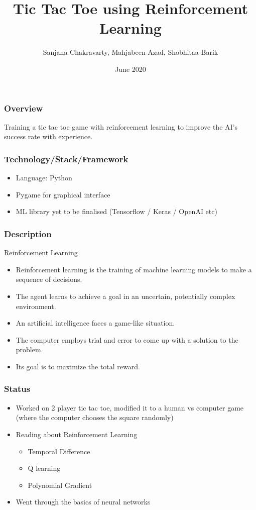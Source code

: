 \documentclass{beamer}
\title{Tic Tac Toe using Reinforcement Learning}
\author[Group 12]{Sanjana Chakravarty, Mahjabeen Azad, Shobhitaa Barik}
\date{June 2020}
\begin{document}
\begin{frame}
    \titlepage
\end{frame}

\begin{frame}
    \frametitle{Overview}
    Training a tic tac toe game with reinforcement learning to improve the AI’s success rate with experience.
\end{frame}

\begin{frame}
    \frametitle{Technology/Stack/Framework}
        \begin{itemize}
            \item Language: Python
            \item Pygame for graphical interface 
            \item ML library yet to be finalised (Tensorflow / Keras / OpenAI etc)
        \end{itemize}
\end{frame}

\begin{frame}
    \frametitle{Description}
    \begin{block}{Reinforcement Learning}        
        \begin{itemize}
            \item<1-> Reinforcement learning is the training of machine learning models to make a sequence of decisions.
            \item<2-> The agent learns to achieve a goal in an uncertain, potentially complex environment.
            \item<3-> An artificial intelligence faces a game-like situation.
            \item<4-> The computer employs trial and error to come up with a solution to the problem.
            \item<5-> Its goal is to maximize the total reward.
        \end{itemize}
    \end{block}
\end{frame}

\begin{frame}
    \frametitle{Status}
    \begin{itemize}
        \item Worked on 2 player tic tac toe, modified it to a human vs computer game (where the computer chooses the square randomly)
        \item Reading about Reinforcement Learning 
            \begin{itemize}
                \item Temporal Difference
                \item Q learning
                \item Polynomial Gradient
            \end{itemize}
        \item Went through the basics of neural networks
    \end{itemize}
\end{frame}
\end{document}

